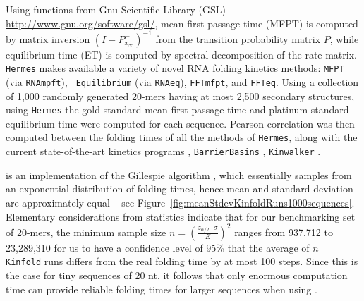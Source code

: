 Using functions from Gnu Scientific Library (GSL)
\url{http://www.gnu.org/software/gsl/}, mean first passage time
(MFPT) is computed by matrix inversion
$(I - P^{-}_{x_{\infty}})^{-1}$ from the transition probability matrix
$P$, while equilibrium time (ET) is computed by spectral
decomposition of the rate matrix. {\tt Hermes} makes available a
variety of novel RNA folding kinetics methods: {\tt MFPT} (via {\tt RNAmpft}), {\tt
Equilibrium} (via {\tt RNAeq}), {\tt FFTmfpt}, and {\tt FFTeq}.
Using a collection of 1,000 randomly generated 20-mers having at most
2,500 secondary structures, using {\tt Hermes} the gold standard
mean first passage time and platinum standard equilibrium time were
computed for each sequence.
Pearson correlation was then computed
between the folding times of all the methods of {\tt Hermes}, along
with the current state-of-the-art kinetics programs \kinfold
\cite{flamm}, {\tt BarrierBasins} \cite{wolfingerStadler:kinetics},
{\tt Kinwalker} \cite{Geis.jmb08}.

\kinfold is an implementation
of the Gillespie algorithm \cite{gillespieStochasticSimulation1},
which essentially samples from an exponential distribution of folding
times, hence \kinfold mean and standard deviation are
approximately equal -- see
Figure~\ref{fig:meanStdevKinfoldRuns1000sequences}. Elementary
considerations from statistics indicate that for our benchmarking set
of 20-mers, the minimum sample size $n = \left( \frac{z_{\alpha/2}
\cdot \sigma}{E} \right)^2$ ranges from 937,712 to 23,289,310 for us
to have a confidence level of 95\% that the average of $n$ {\tt
Kinfold} runs differs from the real folding time by at most 100 steps.
Since this is the case for tiny sequences of 20 nt, it follows that
only enormous computation time can provide reliable folding times for
larger sequences when using \kinfold.

